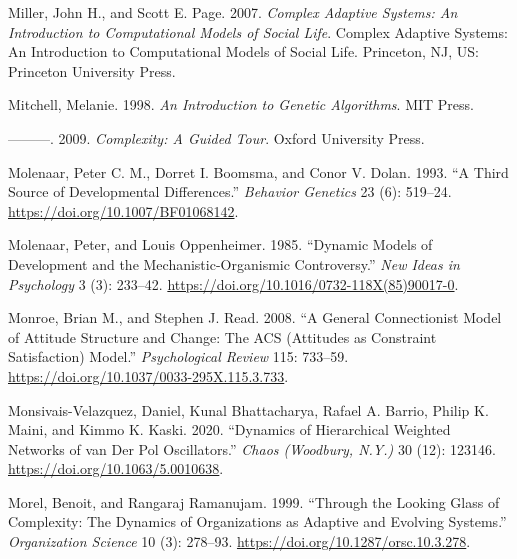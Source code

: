 \documentclass[
  a4paper,
  DIV=11,
  numbers=noendperiod,
  oneside]{scrreprt}
\newlength{\cslhangindent}
\newlength{\cslentryspacingunit} %
\newenvironment{CSLReferences}[2] %
 {%
  \setlength{\parindent}{0pt}
  \ifodd #1
  \let\oldpar\par
  \def\par{\hangindent=\cslhangindent\oldpar}
  \fi
  \setlength{\parskip}{#2\cslentryspacingunit}
 }%
 {}
\begin{document}
\begin{CSLReferences}{1}{0}
\leavevmode{}%
Miller, John H., and Scott E. Page. 2007. \emph{Complex Adaptive
Systems: {An} Introduction to Computational Models of Social Life}.
Complex Adaptive Systems: {An} Introduction to Computational Models of
Social Life. {Princeton, NJ, US}: {Princeton University Press}.

\leavevmode{}%
Mitchell, Melanie. 1998. \emph{An {Introduction} to {Genetic
Algorithms}}. {MIT Press}.

\leavevmode{}%
---------. 2009. \emph{Complexity: {A Guided Tour}}. {Oxford University
Press}.

\leavevmode{}%
Molenaar, Peter C. M., Dorret I. Boomsma, and Conor V. Dolan. 1993. {``A
Third Source of Developmental Differences.''} \emph{Behavior Genetics}
23 (6): 519--24. \url{https://doi.org/10.1007/BF01068142}.

\leavevmode{}%
Molenaar, Peter, and Louis Oppenheimer. 1985. {``Dynamic Models of
Development and the Mechanistic-Organismic Controversy.''} \emph{New
Ideas in Psychology} 3 (3): 233--42.
\url{https://doi.org/10.1016/0732-118X(85)90017-0}.

\leavevmode{}%
Monroe, Brian M., and Stephen J. Read. 2008. {``A General Connectionist
Model of Attitude Structure and Change: {The ACS} ({Attitudes} as
{Constraint Satisfaction}) Model.''} \emph{Psychological Review} 115:
733--59. \url{https://doi.org/10.1037/0033-295X.115.3.733}.

\leavevmode{}%
Monsivais-Velazquez, Daniel, Kunal Bhattacharya, Rafael A. Barrio,
Philip K. Maini, and Kimmo K. Kaski. 2020. {``Dynamics of Hierarchical
Weighted Networks of van Der {Pol} Oscillators.''} \emph{Chaos
(Woodbury, N.Y.)} 30 (12): 123146.
\url{https://doi.org/10.1063/5.0010638}.

\leavevmode{}%
Morel, Benoit, and Rangaraj Ramanujam. 1999. {``Through the {Looking
Glass} of {Complexity}: {The Dynamics} of {Organizations} as {Adaptive}
and {Evolving Systems}.''} \emph{Organization Science} 10 (3): 278--93.
\url{https://doi.org/10.1287/orsc.10.3.278}.


\end{CSLReferences}
\end{document}
